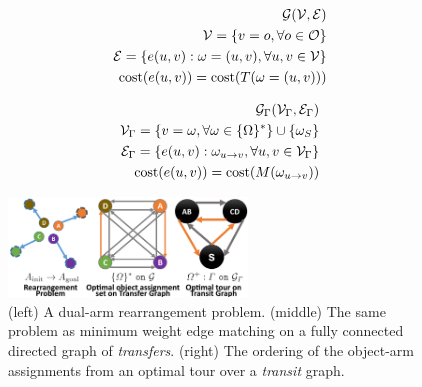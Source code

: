 \begin{minipage}{0.48\textwidth}
  \begin{align}
  \label{eq:transfergraph}
  \begin{split}
  \mathcal{G}(\mathcal{V}, \mathcal{E})\\
  \mathcal{V} = \{ {v}=o, \forall o \in \mathcal{O} \}\\
  \mathcal{E} = \{ {e}(u, v): {\omega} = (u,v), \forall u,v\in\mathcal{V} \}\\
  \textup{cost}({e}(u,v)) = \textup{cost}(T({\omega}=(u,v)))
  \end{split}
  \end{align}
\end{minipage}
\begin{minipage}{0.48\textwidth}
  \begin{align}
  \label{eq:transitgraph}
  \begin{split}
  \mathcal{G}_{{\Gamma}}(\mathcal{V}_{{\Gamma}}, \mathcal{E}_{{\Gamma}})\\
  \mathcal{V}_{{\Gamma}} = \{ {v}={\omega}, \forall {\omega} \in \{{{\Omega}}\}^* \} \cup \{{\omega}_S\} \\
  \mathcal{E}_{{\Gamma}} = \{ {e}(u, v): {\omega}_{u\rightarrow v}, \forall u,v\in\mathcal{V}_{{\Gamma}} \}\\
  \textup{cost}({e}(u,v)) = \textup{cost}(M({\omega}_{u\rightarrow v}))
  \end{split}
  \end{align}
\end{minipage}
\vspace{0.05in}


\begin{figure}\vspace{-0.5in}
	\begin{center}
		\includegraphics[width=2.5in]{figures/mapp_labels}
	\end{center}\vspace{-0.2in}
	\caption{(left) A dual-arm rearrangement problem. (middle) The same problem as minimum weight edge matching on a fully connected directed graph of \textit{transfers}. (right) The ordering of the object-arm assignments from an optimal tour over a \textit{transit} graph.}\vspace{-0.2in}
	\label{fig:edge_matching}
\vspace{-0.1in}
\end{figure}

